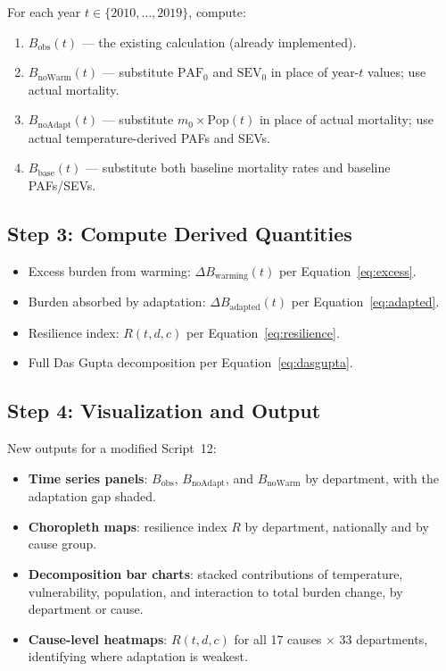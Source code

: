 \documentclass[11pt,a4paper]{article}
\begin{document}
For each year $t \in \{2010, \ldots, 2019\}$, compute:
\begin{enumerate}[nosep]
  \item $B_{\text{obs}}(t)$ --- the existing calculation (already implemented).
  \item $B_{\text{noWarm}}(t)$ --- substitute $\text{PAF}_0$ and $\text{SEV}_0$ in place of year-$t$ values; use actual mortality.
  \item $B_{\text{noAdapt}}(t)$ --- substitute $m_0 \times \text{Pop}(t)$ in place of actual mortality; use actual temperature-derived PAFs and SEVs.
  \item $B_{\text{base}}(t)$ --- substitute both baseline mortality rates and baseline PAFs/SEVs.
\end{enumerate}

\subsection{Step 3: Compute Derived Quantities}

\begin{itemize}[nosep]
  \item Excess burden from warming: $\Delta B_{\text{warming}}(t)$ per Equation~\eqref{eq:excess}.
  \item Burden absorbed by adaptation: $\Delta B_{\text{adapted}}(t)$ per Equation~\eqref{eq:adapted}.
  \item Resilience index: $R(t,d,c)$ per Equation~\eqref{eq:resilience}.
  \item Full Das Gupta decomposition per Equation~\eqref{eq:dasgupta}.
\end{itemize}

\subsection{Step 4: Visualization and Output}

New outputs for a modified Script~12:
\begin{itemize}[nosep]
  \item \textbf{Time series panels}: $B_{\text{obs}}$, $B_{\text{noAdapt}}$, and $B_{\text{noWarm}}$ by department, with the adaptation gap shaded.
  \item \textbf{Choropleth maps}: resilience index $R$ by department, nationally and by cause group.
  \item \textbf{Decomposition bar charts}: stacked contributions of temperature, vulnerability, population, and interaction to total burden change, by department or cause.
  \item \textbf{Cause-level heatmaps}: $R(t,d,c)$ for all 17 causes $\times$ 33 departments, identifying where adaptation is weakest.
\end{itemize}
\end{document}
